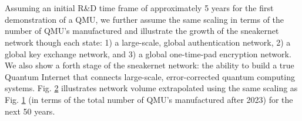 \documentclass[aps,prl,twocolumn,10pt,nofootinbib]{revtex4}
\begin{document}
\begin{figure}[ht!]
	\caption{}
	\label{fig:transistor}
\end{figure}
\\
\\
Assuming an initial R\&D time frame of approximately 5 years for the first demonstration of a QMU, we further assume the same scaling in terms of the number of QMU's manufactured and illustrate the growth of the sneakernet network though each state: 1) a large-scale, global authentication network, 2) a global key exchange network, and 3) a global one-time-pad encryption network.  We also show a forth stage of the sneakernet network: the ability to build a true Quantum Internet that connects large-scale, error-corrected quantum computing systems. Fig. \ref{fig:QMU} illustrates network volume extrapolated using the same scaling as Fig. \ref{fig:transistor} (in terms of the total number of QMU's manufactured after 2023) for the next 50 years. 
\begin{figure}[ht!]
	\caption{}
	\label{fig:QMU}
\end{figure}
\end{document}

